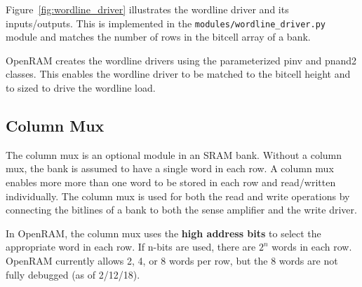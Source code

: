 Figure~\ref{fig:wordline_driver} illustrates the wordline driver and
its inputs/outputs. This is implemented in the
\verb|modules/wordline_driver.py| module and matches the number of
rows in the bitcell array of a bank.

OpenRAM creates the wordline drivers using the parameterized pinv and
pnand2 classes. This enables the wordline driver to be matched to the
bitcell height and to sized to drive the wordline load.



\subsection{Column Mux}
\label{sec:column_mux}
The column mux is an optional module in an SRAM bank. Without a column
mux, the bank is assumed to have a single word in each row. A column
mux enables more more than one word to be stored in each row and
read/written individually.  The column mux is used for both the read
and write operations by connecting the bitlines of a bank to
both the sense amplifier and the write driver.

In OpenRAM, the column mux uses the {\bf high address bits} to select
the appropriate word in each row.  If n-bits are used, there are $2^n$
words in each row. OpenRAM currently allows 2, 4, or 8 words per row,
but the 8 words are not fully debugged (as of 2/12/18).






